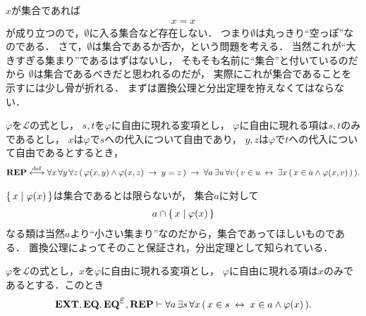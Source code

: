 	$x$が集合であれば
	\begin{align}
		x = x
	\end{align}
	が成り立つので，$\emptyset$に入る集合など存在しない．
	つまり$\emptyset$は丸っきり``空っぽ''なのである．
	さて，$\emptyset$は集合であるか否か，という問題を考える．
	当然これが``大きすぎる集まり''であるはずはないし，
	そもそも名前に``集合''と付いているのだから
	$\emptyset$は集合であるべきだと思われるのだが，
	実際にこれが集合であることを示すには少し骨が折れる．
	まずは置換公理と分出定理を拵えなくてはならない．
	
	\begin{screen}
		\begin{axm}[置換公理]
			$\varphi$を$\mathcal{L}$の式とし，
			$s,t$を$\varphi$に自由に現れる変項とし，
			$\varphi$に自由に現れる項は$s,t$のみであるとし，
			$x$は$\varphi$で$s$への代入について自由であり，
			$y,z$は$\varphi$で$t$への代入について自由であるとするとき，
			\begin{align}
				\mbox{{\bf REP}} \overset{\mathrm{def}}{\longleftrightarrow} \forall x\, \forall y\, \forall z\, 
				(\, \varphi(x,y) \wedge \varphi(x,z)
				\hspace{0.25em}\rightarrow\hspace{0.25em} y = z\, )
				\hspace{0.25em}\rightarrow\hspace{0.25em} \forall a\, \exists u\, \forall v\,
				(\, v \in u \hspace{0.25em}\leftrightarrow\hspace{0.25em} \exists x\, (\, x \in a \wedge 
				\varphi(x,v)\, )\, ).
			\end{align}
		\end{axm}
	\end{screen}
	
	$\left\{\, x \mid \varphi(x)\, \right\}$は集合であるとは限らないが，
	集合$a$に対して
	\begin{align}
		a \cap \left\{\, x \mid \varphi(x)\, \right\}
	\end{align}
	なる類は当然$a$より``小さい集まり''なのだから，集合であってほしいものである．
	置換公理によってそのこと保証され，分出定理として知られている．
	
	\begin{screen}
		\begin{thm}[分出定理]\label{thm:axiom_of_separation}
			$\varphi$を$\mathcal{L}$の式とし，$x$を$\varphi$に自由に現れる変項とし，
			$\varphi$に自由に現れる項は$x$のみであるとする．このとき
			\begin{align}
				\EXTAX,\EQAX,\EQAXEP,\REPAX \vdash 
				\forall a\, \exists s\, \forall x\,
				(\, x \in s \lrarrow x \in a \wedge \varphi(x)\, ).
				\label{fom:thm_axiom_of_separation_0}
			\end{align}
		\end{thm}
	\end{screen}
	
